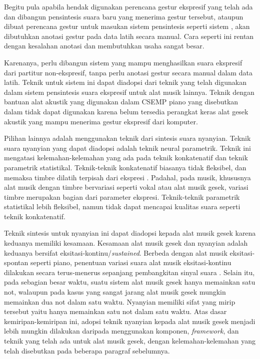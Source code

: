Begitu pula apabila hendak digunakan perencana gestur ekspresif yang telah ada \parencite{marchini2014quartet}\parencite{yu2017bowing} dan dibangun pensintesis suara baru yang menerima gestur tersebut, ataupun dibuat perencana gestur untuk masukan sistem pensintesis seperti sistem \citet{lindemann2007rpm}, akan dibutuhkan anotasi gestur pada data latih secara manual. Cara seperti ini rentan dengan kesalahan anotasi dan membutuhkan usaha sangat besar.

Karenanya, perlu dibangun sistem yang mampu menghasilkan suara ekspresif dari partitur non-ekspresif, tanpa perlu anotasi gestur secara manual dalam data latih. Teknik untuk sistem ini dapat diadopsi dari teknik yang telah digunakan dalam sistem pensintesis suara ekspresif untuk alat musik lainnya. Teknik dengan bantuan alat akustik yang digunakan dalam CSEMP piano yang disebutkan dalam \citet{schubert2017test} tidak dapat digunakan karena belum tersedia perangkat keras alat gesek akustik yang mampu menerima gestur ekspresif dari komputer.

Pilihan lainnya adalah menggunakan teknik dari sintesis suara nyanyian. Teknik suara nyanyian yang dapat diadopsi adalah teknik neural parametrik. Teknik ini mengatasi kelemahan-kelemahan yang ada pada teknik konkatenatif dan teknik parametrik statistikal\parencite{bonada2017singing}. Teknik-teknik konkatenatif \parencite{Bonada2016ExpressiveSS}\parencite{Bonada2007SynthesisOT} biasanya tidak fleksibel, dan memaksa timbre dilatih terpisah dari ekspresi \parencite{bonada2017singing}. Padahal, pada musik, khususnya alat musik dengan timbre bervariasi seperti vokal atau alat musik gesek, variasi timbre merupakan bagian dari parameter ekspresi. Teknik-teknik parametrik statistikal lebih fleksibel, namun tidak dapat mencapai kualitas suara seperti teknik konkatenatif.

Teknik sintesis untuk nyanyian ini dapat diadopsi kepada alat musik gesek karena keduanya memiliki kesamaan. Kesamaan alat musik gesek dan nyanyian adalah keduanya bersifat eksitasi-kontinu/\textit{sustained}. Berbeda dengan alat musik eksitasi-spontan seperti piano, penentuan variasi suara alat musik eksitasi-kontinu dilakukan secara terus-menerus sepanjang pembangkitan sinyal suara \parencite{Maestre2010StatisticalMO}. Selain itu, pada sebagian besar waktu, suatu sistem alat musik gesek hanya memainkan satu not, walaupun pada kasus yang sangat jarang alat musik gesek mungkin memainkan dua not dalam satu waktu. Nyanyian memiliki sifat yang mirip tersebut yaitu hanya memainkan satu not dalam satu waktu. Atas dasar kemiripan-kemiripan ini, adopsi teknik nyanyian kepada alat musik gesek menjadi lebih mungkin dilakukan daripada menggunakan komponen, \textit{framework}, dan teknik yang telah ada untuk alat musik gesek, dengan kelemahan-kelemahan yang telah disebutkan pada beberapa paragraf sebelumnya.

